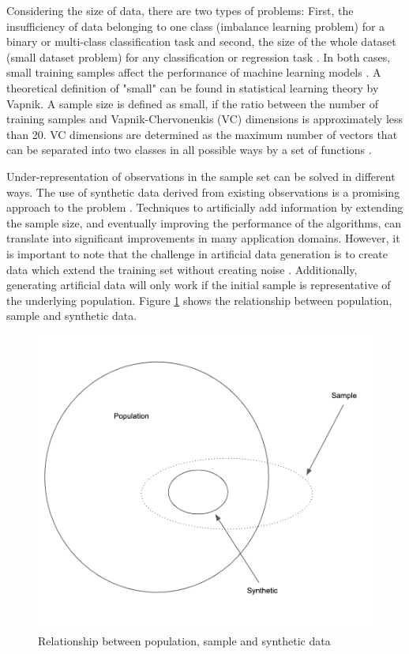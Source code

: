 \documentclass[parskip=full]{scrartcl}
\begin{document}
Considering the size of data, there are two types of problems: First, the
insufficiency of data belonging to one class (imbalance learning problem) for a
binary or multi-class classification task and second, the size of the whole
dataset (small dataset problem) for any classification or regression task
\cite{Sezer.2014}. In both cases, small training samples affect the performance
of machine learning models \cite{Tsai.2008}. A theoretical definition of "small"
can be found in statistical learning theory by Vapnik. A sample size is defined
as small, if the ratio between the number of training samples and
Vapnik-Chervonenkis (VC) dimensions is approximately less than 20. VC dimensions
are determined as the maximum number of vectors that can be separated into two
classes in all possible ways by a set of functions \cite{Vapnik.2008}.

Under-representation of observations in the sample set can be solved in
different ways. The use of synthetic data derived from existing observations is
a promising approach to the problem \cite{Sezer.2014}. Techniques to
artificially add information by extending the sample size, and eventually
improving the performance of the algorithms, can translate into significant
improvements in many application domains. However, it is important to note that
the challenge in artificial data generation is to create data which extend the
training set without creating noise \cite{Li.2006}. Additionally, generating
artificial data will only work if the initial sample is representative of the
underlying population. Figure \ref{fig:relationship} shows the relationship
between population, sample and synthetic data.

\begin{figure}[H]
	\centering
	\includegraphics[width=0.75\linewidth]{../analysis/relationship.png}
	\caption{Relationship between population, sample and synthetic data \cite{Li.2006}}
	\label{fig:relationship}
\end{figure}
\end{document}
